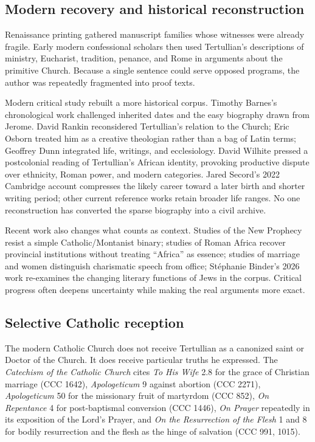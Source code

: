 \subsection{Modern recovery and historical reconstruction}

Renaissance printing gathered manuscript families whose witnesses were already
fragile. Early modern confessional scholars then used Tertullian's descriptions
of ministry, Eucharist, tradition, penance, and Rome in arguments about the
primitive Church. Because a single sentence could serve opposed programs, the
author was repeatedly fragmented into proof texts.

Modern critical study rebuilt a more historical corpus. Timothy Barnes's
chronological work challenged inherited dates and the easy biography drawn
from Jerome. David Rankin reconsidered Tertullian's relation to the Church;
Eric Osborn treated him as a creative theologian rather than a bag of Latin
terms; Geoffrey Dunn integrated life, writings, and ecclesiology. David Wilhite
pressed a postcolonial reading of Tertullian's African identity, provoking
productive dispute over ethnicity, Roman power, and modern categories. Jared
Secord's 2022 Cambridge account compresses the likely career toward a later
birth and shorter writing period; other current reference works retain broader
life ranges. No one reconstruction has converted the sparse biography into a
civil archive.

Recent work also changes what counts as context. Studies of the New Prophecy
resist a simple Catholic/Montanist binary; studies of Roman Africa recover
provincial institutions without treating ``Africa'' as essence; studies of
marriage and women distinguish charismatic speech from office; St\'ephanie
Binder's 2026 work re-examines the changing literary functions of Jews in the
corpus. Critical progress often deepens uncertainty while making the real
arguments more exact.

\subsection{Selective Catholic reception}

The modern Catholic Church does not receive Tertullian as a canonized saint or
Doctor of the Church. It does receive particular truths he expressed. The
\emph{Catechism of the Catholic Church} cites \emph{To His Wife} 2.8 for the
grace of Christian marriage (CCC 1642), \emph{Apologeticum} 9 against abortion
(CCC 2271), \emph{Apologeticum} 50 for the missionary fruit of martyrdom (CCC
852), \emph{On Repentance} 4 for post-baptismal conversion (CCC 1446), \emph{On
Prayer} repeatedly in its exposition of the Lord's Prayer, and \emph{On the
Resurrection of the Flesh} 1 and 8 for bodily resurrection and the flesh as the
hinge of salvation (CCC 991, 1015).


